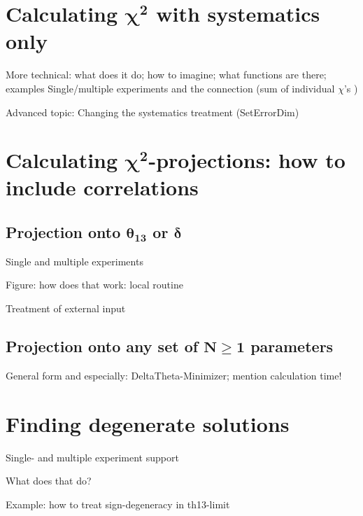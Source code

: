 \chapter[Calculating $\chi^2$ with systematics only]{Calculating $\boldsymbol{\chi^2}$ with systematics only}

\bi
\item
 More technical: what does it do; how to imagine; what functions are there; examples
 Single/multiple experiments and the connection (sum of individual $\chi$'s )
\item
 Advanced topic: Changing the systematics treatment (SetErrorDim)
\ei


\chapter[Calculating $\chi^2$-projections: how to include correlations]{Calculating $\boldsymbol{\chi^2}$-projections: how to include correlations}

\section[Projection onto $\theta_{13}$ or $\delta$]{Projection onto $\boldsymbol{\theta_{13}}$ or $\boldsymbol{\delta}$}

\bi
\item
 Single and multiple experiments
\item
 Figure: how does that work: local routine
\item
 Treatment of external input
\ei

\section[Projection onto any set of $N \ge 1$ parameters]{Projection onto any set of $\boldsymbol{N \ge 1}$ parameters}

General form and especially: DeltaTheta-Minimizer; mention calculation time!

\chapter{Finding degenerate solutions}

\bi
\item
 Single- and multiple experiment support
\item
 What does that do?
\item
 Example: how to treat sign-degeneracy in th13-limit
\ei

